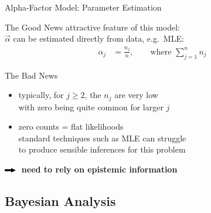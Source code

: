 \documentclass{beamer}
\def\then{{\color{lmugreen}$\rule[0.35ex]{2ex}{0.5ex}\!\!\!\blacktriangleright$}}
\begin{document}
\begin{frame}{Alpha-Factor Model: Parameter Estimation}
  \begin{exampleblock}{The Good News}
    attractive feature of this model: \\
    $\vec{\alpha}$ can be estimated directly from data, e.g.\ MLE:
    \begin{align*}
      \alpha_j &= \frac{n_j}{n},\qquad \text{where $\textstyle\sum_{j=1}^n n_j$}
    \end{align*}
  \end{exampleblock}
  \begin{alertblock}{The Bad News}
    \begin{itemize}
    \item typically, for $j\ge 2$, the $n_j$ are very low \\
      with zero being quite common for larger $j$
    \item zero counts = flat likelihoods \\
      standard techniques such as MLE can struggle \\
      to produce sensible inferences for this problem
    \end{itemize}
  \end{alertblock}
  \vspace*{-1ex}
  \begin{center}
    \textbf{\then\ need to rely on \alert{epistemic information}}
  \end{center}
\end{frame}

\subsection{Bayesian Analysis}
\end{document}
